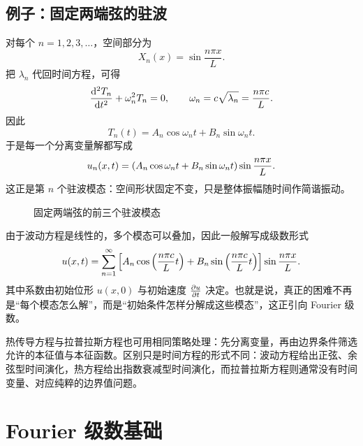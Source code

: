 \subsection{例子：固定两端弦的驻波}

对每个 $n=1,2,3,\dots$，空间部分为
\[
  X_n(x)=\sin\frac{n\pi x}{L}.
\]
把 $\lambda_n$ 代回时间方程，可得
\[
  \dv[2]{T_n}{t}+\omega_n^2 T_n=0,
  \qquad
  \omega_n=c\sqrt{\lambda_n}=\frac{n\pi c}{L}.
\]
因此
\[
  T_n(t)=A_n\cos \omega_n t+B_n\sin \omega_n t.
\]
于是每一个分离变量解都写成
\[
  u_n(x,t)=\qty(A_n\cos \omega_n t+B_n\sin \omega_n t)\sin\frac{n\pi x}{L}.
\]
这正是第 $n$ 个驻波模态：空间形状固定不变，只是整体振幅随时间作简谐振动。

\begin{figure}[htbp]
\centering
{}
\caption{固定两端弦的前三个驻波模态}
\end{figure}

由于波动方程是线性的，多个模态可以叠加，因此一般解写成级数形式
\[
  u(x,t)=\sum_{n=1}^{\infty}\qty[A_n\cos\qty(\frac{n\pi c}{L}t)+B_n\sin\qty(\frac{n\pi c}{L}t)]\sin\frac{n\pi x}{L}.
\]
其中系数由初始位形 $u(x,0)$ 与初始速度 $\pdv{u}{t}(x,0)$ 决定。也就是说，真正的困难不再是“每个模态怎么解”，而是“初始条件怎样分解成这些模态”，这正引向 Fourier 级数。

\begin{remark}
热传导方程与拉普拉斯方程也可用相同策略处理：先分离变量，再由边界条件筛选允许的本征值与本征函数。区别只是时间方程的形式不同：波动方程给出正弦、余弦型时间演化，热方程给出指数衰减型时间演化，而拉普拉斯方程则通常没有时间变量、对应纯粹的边界值问题。
\end{remark}

\section{Fourier 级数基础}

